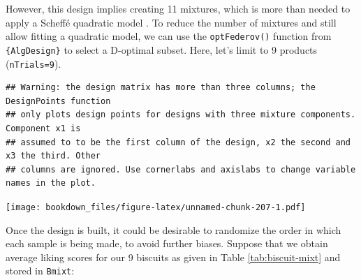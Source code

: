 \documentclass[
]{krantz}
\makeatletter
\newenvironment{Shaded}{\begin{snugshade}}{\end{snugshade}}
\newcommand{\AttributeTok}[1]{\textcolor[rgb]{0.61,0.61,0.61}{#1}}
\newcommand{\ConstantTok}[1]{\textcolor[rgb]{0,0,0}{#1}}
\newcommand{\DecValTok}[1]{\textcolor[rgb]{0.06,0.06,0.06}{#1}}
\newcommand{\FunctionTok}[1]{\textcolor[rgb]{0,0,0}{#1}}
\newcommand{\NormalTok}[1]{#1}
\newcommand{\OtherTok}[1]{\textcolor[rgb]{0.37,0.37,0.37}{#1}}
\newcommand{\SpecialCharTok}[1]{\textcolor[rgb]{0,0,0}{#1}}
\newcommand{\StringTok}[1]{\textcolor[rgb]{0.5,0.5,0.5}{#1}}
\newenvironment{kframe}{%
\medskip{}
\setlength{\fboxsep}{.8em}
 \def\at@end@of@kframe{}%
 \ifinner\ifhmode%
  \def\at@end@of@kframe{\end{minipage}}%
  \begin{minipage}{\columnwidth}%
 \fi\fi%
 \def\FrameCommand##1{\hskip\@totalleftmargin \hskip-\fboxsep
 \colorbox{shadecolor}{##1}\hskip-\fboxsep
     \hskip-\linewidth \hskip-\@totalleftmargin \hskip\columnwidth}%
 \MakeFramed {\advance\hsize-\width
   \@totalleftmargin\z@ \linewidth\hsize
   \@setminipage}}%
 {\par\unskip\endMakeFramed%
 \at@end@of@kframe}
\renewenvironment{Shaded}{\begin{kframe}}{\end{kframe}}
\makeatother
\begin{document}
However, this design implies creating 11 mixtures, which is more than needed to apply a Scheffé quadratic model \citep{Lawson2016}. To reduce the number of mixtures and still allow fitting a quadratic model, we can use the \texttt{optFederov()} function from \texttt{\{AlgDesign\}} to select a D-optimal subset. Here, let's limit to 9 products (\texttt{nTrials=9}).

\begin{Shaded}
\end{Shaded}

\begin{verbatim}
## Warning: the design matrix has more than three columns; the DesignPoints function  
## only plots design points for designs with three mixture components. Component x1 is 
## assumed to to be the first column of the design, x2 the second and x3 the third. Other 
## columns are ignored. Use cornerlabs and axislabs to change variable names in the plot.
\end{verbatim}

\texttt{[image: bookdown\_files/figure-latex/unnamed-chunk-207-1.pdf]}

Once the design is built, it could be desirable to randomize the order in which each sample is being made, to avoid further biases. Suppose that we obtain average liking scores for our 9 biscuits as given in Table \ref{tab:biscuit-mixt} and stored in \texttt{Bmixt}:
\end{document}
